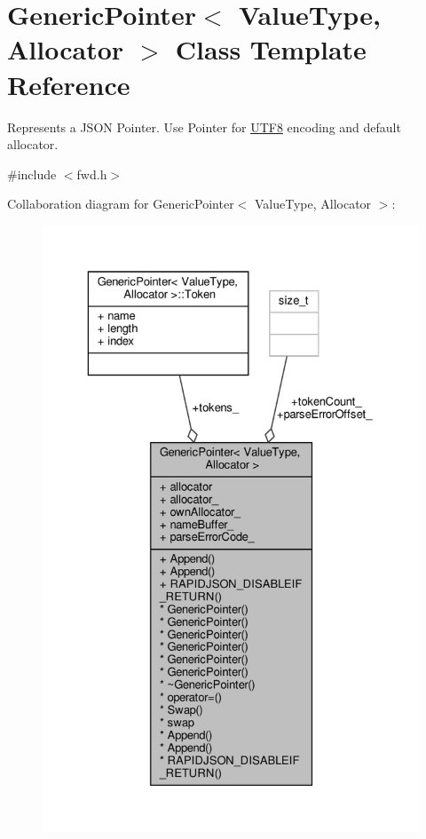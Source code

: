 \hypertarget{classGenericPointer}{}\section{Generic\+Pointer$<$ Value\+Type, Allocator $>$ Class Template Reference}
\label{classGenericPointer}


Represents a J\+S\+ON Pointer. Use Pointer for \hyperlink{structUTF8}{U\+T\+F8} encoding and default allocator.  




{\ttfamily \#include $<$fwd.\+h$>$}



Collaboration diagram for Generic\+Pointer$<$ Value\+Type, Allocator $>$\+:
\nopagebreak
\begin{figure}[H]
\begin{center}
\leavevmode
\includegraphics[width=329pt]{classGenericPointer__coll__graph}
\end{center}
\end{figure}
